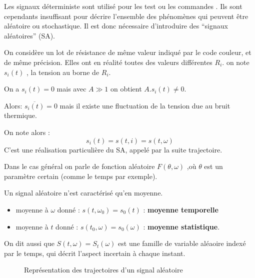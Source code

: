 \documentclass[main.tex]{subfiles}
\begin{document}
Les signaux déterministe sont utilisé pour les test ou les commandes . Ils sont cependants insuffisant pour décrire l'ensemble des phénomènes qui peuvent être aléatoire ou stochastique. Il est donc nécessaire d'introduire des ``signaux aléatoires'' (SA).
\begin{exemple}
  On considère un lot de résistance de même valeur indiqué par le code couleur, et de même précision. Elles ont en réalité toutes des valeurs différentes $R_i$. on note $s_i(t)$ , la tension au borne de $R_i$.

  On a $s_i(t)=0$ mais avec $A\gg1$ on obtient $A.s_i(t)\neq 0$.

  Alors: $\overline{s_i(t)} = 0$ mais il existe une fluctuation de la tension due au bruit thermique.

  On note alors :
  \[
    s_i(t) = s(t,i) = s(t,\omega)
  \]
  C'est une réalisation particulière du SA, appelé par la suite trajectoire.
\end{exemple}

Dans le cas général on parle de fonction aléatoire $F(\theta,\omega)$ ,où $\theta$ est un paramètre certain (comme le temps par exemple).


\begin{rem}
  Un signal aléatoire n'est caractérisé qu'en moyenne.
  \begin{itemize}
  \item moyenne à $\omega$ donné : $s(t,\omega_0) =s_0(t)$ : \textbf{moyenne temporelle}
  \item moyenne à $t$ donné : $s(t_0,\omega) = s_0(\omega)$ : \textbf{moyenne statistique}.
  \end{itemize}
\end{rem}
On dit aussi que $S(t,\omega) = S_t(\omega)$ est une famille de variable aléaoire indexé par le temps, qui décrit l'aspect incertain à chaque instant.
\begin{figure}[H]
  \centering
  \caption{Représentation des trajectoires d'un signal aléatoire}
\end{figure}
\end{document}

